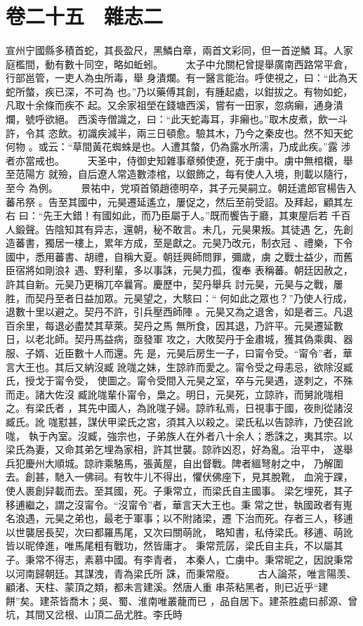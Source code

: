 \documentclass{ctexart}
\begin{document}
\section{卷二十五　雜志二}
\paragraph{}
宣州宁國縣多積首蛇，其長盈尺，黑鱗白章，兩首文彩同，但一首逆鱗 耳。人家庭檻間，動有數十同空，略如蚯蚓。 　　太子中允關杞曾提舉廣南西路常平倉，行部邕管，一吏人為虫所毒，舉 身潰爛。有一醫言能治。呼使視之，曰：``此為天蛇所螫，疾已深，不可為 也。''乃以藥傅其創，有腫起處，以鉗拔之。有物如蛇，凡取十余條而疾不 起。又余家祖塋在錢塘西溪，嘗有一田家，忽病癩，通身潰爛，號呼欲絕。 西溪寺僧識之，曰：``此天蛇毒耳，非癩也。''取木皮煮，飲一斗許，令其 恣飲。初識疾減半，兩三日頓愈。驗其木，乃今之秦皮也。然不知天蛇何物 。或云：``草間黃花蜘蛛是也。人遭其螫，仍為露水所濡，乃成此疾。''露 涉者亦當戒也。 　　天圣中，侍御史知雜事章頻使遼，死于虜中。虜中無棺櫬，舉至范陽方 就殮，自后遼人常造數漆棺，以銀飾之，每有使人入境，則載以隨行，至今 為例。 　　景祐中，党項首領趙德明卒，其子元昊嗣立。朝廷遣郎官楊告入蕃吊祭 。告至其國中，元昊遷延遙立，屢促之，然后至前受詔。及拜起，顧其左右 曰：``先王大錯！有國如此，而乃臣屬于人。''既而饗告于廳，其東屋后若 千百人鍛聲。告陰知其有异志，還朝，秘不敢言。未几，元昊果叛。其徒遇 乞，先創造蕃書，獨居一樓上，累年方成，至是獻之。元昊乃改元，制衣冠 、禮樂，下令國中，悉用蕃書、胡禮，自稱大夏。朝廷興師問罪，彌歲，虜 之戰士益少，而舊臣宿將如剛浪礻遇、野利輩，多以事誅，元昊力孤，復奉 表稱蕃。朝廷因赦之，許其自新。元昊乃更稱兀卒曩宵。慶歷中，契丹舉兵 討元昊，元昊与之戰，屢胜，而契丹至者日益加眾。元昊望之，大駭曰：`` 何如此之眾也？''乃使人行成，退數十里以避之。契丹不許，引兵壓西師陣 。元昊又為之退舍，如是者三。凡退百余里，每退必盡焚其草萊。契丹之馬 無所食，因其退，乃許平。元昊遷延數日，以老北師。契丹馬益病，亟發軍 攻之，大敗契丹于金肅城，獲其偽乘輿、器服、子婿、近臣數十人而還。先 是，元昊后房生一子，曰甯令受。``甯令''者，華言大王也。其后又納沒臧 訛哤之妹，生諒祚而愛之。甯令受之母恚忌，欲除沒臧氏，授戈于甯令受， 使圖之。甯令受間入元昊之室，卒与元昊遇，遂刺之，不殊而走。諸大佐沒 臧訛哤輩仆甯令，梟之。明日，元昊死，立諒祚，而舅訛哤相之。有梁氏者 ，其先中國人，為訛哤子婦。諒祚私焉，日視事于國，夜則從諸沒臧氏。訛 哤懟甚，謀伏甲梁氏之宮，須其入以殺之。梁氏私以告諒祚，乃使召訛哤， 執于內室。沒臧，強宗也，子弟族人在外者八十余人；悉誅之，夷其宗。以 梁氏為妻，又命其弟乞埋為家相，許其世襲。諒祚凶忍，好為亂。治平中， 遂舉兵犯慶州大順城。諒祚乘駱馬，張黃屋，自出督戰。陴者縕弩射之中， 乃解圍去。創甚，馳入一佛祠。有牧牛儿不得出，懼伏佛座下，見其脫靴， 血涴于踝，使人裹創舁載而去。至其國，死。子秉常立，而梁氏自主國事。 梁乞埋死，其子移逋繼之，謂之沒甯令。``沒甯令''者，華言天大王也。秉 常之世，執國政者有嵬名浪遇，元昊之弟也，最老于軍事；以不附諸梁，遷 下治而死。存者三人，移逋以世襲居長契，次曰都羅馬尾，又次曰關萌訛， 略知書，私侍梁氏。移逋、萌訛皆以昵倖進，唯馬尾粗有戰功，然皆庸才。 秉常荒孱，梁氏自主兵，不以屬其子。秉常不得志，素慕中國。有李青者， 本秦人，亡虜中。秉常昵之，因說秉常以河南歸朝廷。其謀洩，青為梁氏所 誅，而秉常廢。 　　古人論茶，唯言陽羡、顧渚、天柱、蒙頂之類，都未言建溪。然唐人重 串茶粘黑者，則已近乎``建餅''矣。建茶皆喬木；吳、蜀、淮南唯叢蘢而已 ，品自居下。建茶胜處曰郝源、曾坑，其間又岔根、山頂二品尤胜。李氏時 
\end{document}
